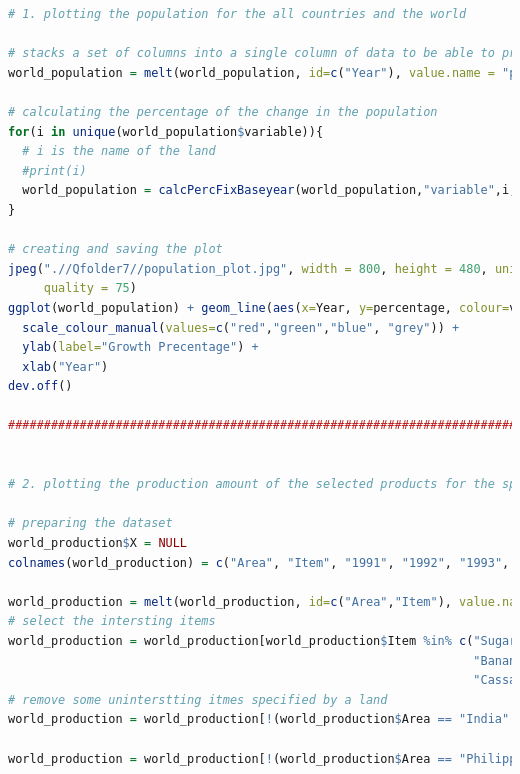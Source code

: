 \documentclass[11pt]{article}
\begin{document}
\begin{lstlisting}[language= R]
# 1. plotting the population for the all countries and the world

# stacks a set of columns into a single column of data to be able to process it 
world_population = melt(world_population, id=c("Year"), value.name = "population")

# calculating the percentage of the change in the population
for(i in unique(world_population$variable)){
  # i is the name of the land 
  #print(i)
  world_population = calcPercFixBaseyear(world_population,"variable",i,"Year",1991,"population", "percentage")
}

# creating and saving the plot
jpeg(".//Qfolder7//population_plot.jpg", width = 800, height = 480, units = "px", pointsize = 12,
     quality = 75)
ggplot(world_population) + geom_line(aes(x=Year, y=percentage, colour=variable), size=1.2) +
  scale_colour_manual(values=c("red","green","blue", "grey")) +
  ylab(label="Growth Precentage") +
  xlab("Year") 
dev.off()

############################################################################################################


# 2. plotting the production amount of the selected products for the specified countries compared to the world

# preparing the dataset 
world_production$X = NULL
colnames(world_production) = c("Area", "Item", "1991", "1992", "1993", "1994", "1995", "1996", "1997", "1998", "1999", "2000", "2001", "2002", "2003", "2004", "2005", "2006", "2007", "2008", "2009", "2010", "2011", "2012", "2013", "2014", "2015")

world_production = melt(world_production, id=c("Area","Item"), value.name = "Production_Amount")
# select the intersting items
world_production = world_production[world_production$Item %in% c("Sugar cane", "Rice, paddy", "Wheat", "Potatoes",
                                                                 "Bananas", "Coconuts",
                                                                 "Cassava", "Beans, dry", "Maize", "Sweet potatoes"),]
# remove some uninterstting itmes specified by a land
world_production = world_production[!(world_production$Area == "India" & world_production$Item %in% c("Cassava", "Bananas", "Beans, dry", "Maize", "Sweet potatoes", "Coconuts")),]

world_production = world_production[!(world_production$Area == "Philippines" & world_production$Item %in% c("Cassava", "Wheat", "Beans, dry", "Maize", "Sweet potatoes", "Potatoes")),]


\end{lstlisting}
\end{document}
